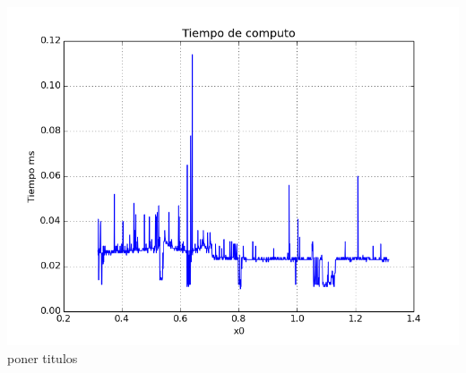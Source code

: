 \begin{center}
\includegraphics[scale=0.5]{graficos/tiempo-e-newton-alfa_fijo-absoluto-0.0001-alejando.png}\\
poner titulos
\end{center}





